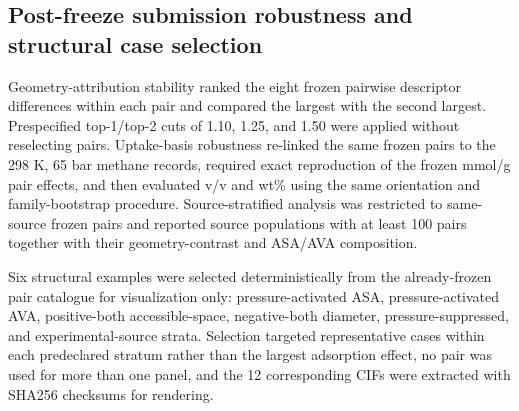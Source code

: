 \subsection{Post-freeze submission robustness and structural case selection}

Geometry-attribution stability ranked the eight frozen pairwise descriptor
differences within each pair and compared the largest with the second largest.
Prespecified top-1/top-2 cuts of 1.10, 1.25, and 1.50 were applied without
reselecting pairs. Uptake-basis robustness re-linked the same frozen pairs to the
298 K, 65 bar methane records, required exact reproduction of the frozen mmol/g
pair effects, and then evaluated v/v and wt\% using the same orientation and
family-bootstrap procedure. Source-stratified analysis was restricted to same-source
frozen pairs and reported source populations with at least 100 pairs together with
their geometry-contrast and ASA/AVA composition.

Six structural examples were selected deterministically from the already-frozen
pair catalogue for visualization only: pressure-activated ASA, pressure-activated
AVA, positive-both accessible-space, negative-both diameter, pressure-suppressed,
and experimental-source strata. Selection targeted representative cases within each
predeclared stratum rather than the largest adsorption effect, no pair was used for
more than one panel, and the 12 corresponding CIFs were extracted with SHA256
checksums for rendering.
